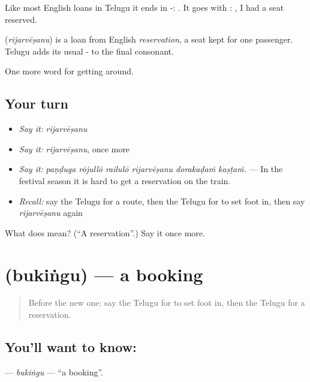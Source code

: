 Like most English loans in Telugu it ends in -: . It goes with :  , I had a seat reserved.

\begin{cousinweb}
\textbf{} (\emph{rijarvēṣanu}) is a loan from English \emph{reservation}, a seat kept for one passenger. Telugu adds its usual - to the final consonant.
\end{cousinweb}

\begin{grammarlens}[title={What you've built}]
One more word for getting around.
\end{grammarlens}

\subsection*{Your turn}
\begin{itemize}
\raggedright
  \item \emph{Say it:} \emph{rijarvēṣanu}
  \item \emph{Say it:} \emph{rijarvēṣanu}, once more
  \item \emph{Say it:} \emph{paṇḍuga rōjullō railulō rijarvēṣanu dorakaḍaṁ kaṣṭaṁ.} — In the festival season it is hard to get a reservation on the train.
  \item \emph{Recall:} say the Telugu for a route, then the Telugu for to set foot in, then say \emph{rijarvēṣanu} again
\end{itemize}

\begin{tcolorbox}[breakable,colback=teal!4,colframe=teal!35!black,title={Before you move on}]
What does  mean? (\textquotedblleft{}A reservation\textquotedblright{}.) Say it once more.
\end{tcolorbox}
\section[\texorpdfstring{\te{బుకింగు} (bukiṅgu)}{బుకింగు (bukiṅgu)}]{ (bukiṅgu) — a booking}

\label{lesson:TE-C439-bukingu}



\begin{quote}
Before the new one: say the Telugu for to set foot in, then the Telugu for a reservation.
\end{quote}

\subsection*{You'll want to know: }
\textbf{} — \emph{bukiṅgu} — \textquotedblleft{}a booking\textquotedblright{}.

